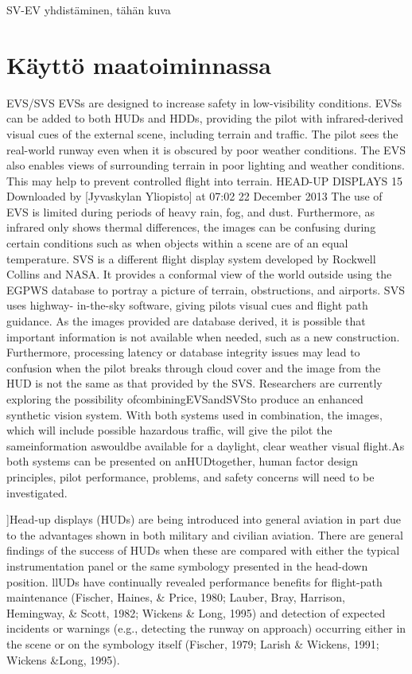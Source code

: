 \documentclass[utf8,bachelor,manualbib]{gradu3}
\begin{document}
SV-EV yhdistäminen, tähän kuva \citep{mollersachs1994}


\section{Käyttö maatoiminnassa}













EVS/SVS
EVSs are designed to increase safety in low-visibility conditions. EVSs can be
added to both HUDs and HDDs, providing the pilot with infrared-derived visual
cues of the external scene, including terrain and traffic. The pilot sees the
real-world runway even when it is obscured by poor weather conditions. The
EVS also enables views of surrounding terrain in poor lighting and weather conditions.
This may help to prevent controlled flight into terrain.
HEAD-UP DISPLAYS 15
Downloaded by [Jyvaskylan Yliopisto] at 07:02 22 December 2013
The use of EVS is limited during periods of heavy rain, fog, and dust. Furthermore,
as infrared only shows thermal differences, the images can be confusing during
certain conditions such as when objects within a scene are of an equal
temperature.
SVS is a different flight display system developed by Rockwell Collins and
NASA. It provides a conformal view of the world outside using the EGPWS database
to portray a picture of terrain, obstructions, and airports. SVS uses highway-
in-the-sky software, giving pilots visual cues and flight path guidance. As the
images provided are database derived, it is possible that important information is
not available when needed, such as a new construction. Furthermore, processing
latency or database integrity issues may lead to confusion when the pilot breaks
through cloud cover and the image from the HUD is not the same as that provided
by the SVS.
Researchers are currently exploring the possibility ofcombiningEVSandSVSto
produce an enhanced synthetic vision system. With both systems used in combination,
the images, which will include possible hazardous traffic, will give the pilot the
sameinformation aswouldbe available for a daylight, clear weather visual flight.As
both systems can be presented on anHUDtogether, human factor design principles,
pilot performance, problems, and safety concerns will need to be investigated. \citep{crawford2006}

]Head-up displays (HUDs) are being introduced into general aviation in part due to
the advantages shown in both military and civilian aviation. There are general
findings of the success of HUDs when these are compared with either the typical
instrumentation panel or the same symbology presented in the head-down position.
llUDs have continually revealed performance benefits for flight-path maintenance
(Fischer, Haines, \& Price, 1980; Lauber, Bray, Harrison, Hemingway, \& Scott, 1982; Wickens \& Long, 1995) and detection of expected incidents or warnings
(e.g., detecting the runway on approach) occurring either in the scene or on the
symbology itself (Fischer, 1979; Larish \& Wickens, 1991; Wickens \&Long, 1995).
\end{document}
